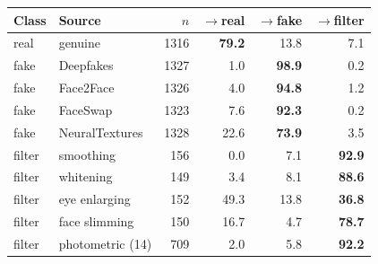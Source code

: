 \begin{tabular}{llrrrr}
\toprule
Class & Source & $n$ & $\to$real & $\to$fake & $\to$filter \\
\midrule
real & genuine & 1316 & \textbf{79.2} & 13.8 & 7.1 \\
fake & Deepfakes & 1327 & 1.0 & \textbf{98.9} & 0.2 \\
fake & Face2Face & 1326 & 4.0 & \textbf{94.8} & 1.2 \\
fake & FaceSwap & 1323 & 7.6 & \textbf{92.3} & 0.2 \\
fake & NeuralTextures & 1328 & 22.6 & \textbf{73.9} & 3.5 \\
filter & smoothing & 156 & 0.0 & 7.1 & \textbf{92.9} \\
filter & whitening & 149 & 3.4 & 8.1 & \textbf{88.6} \\
filter & eye enlarging & 152 & 49.3 & 13.8 & \textbf{36.8} \\
filter & face slimming & 150 & 16.7 & 4.7 & \textbf{78.7} \\
filter & photometric (14) & 709 & 2.0 & 5.8 & \textbf{92.2} \\
\bottomrule
\end{tabular}
